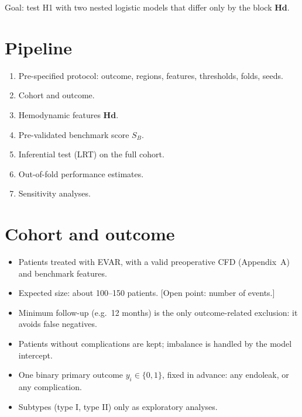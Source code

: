 Goal: test H1 with two nested logistic models that differ only by the block $\mathbf{Hd}$.

\section{Pipeline}
\begin{enumerate}
    \item Pre-specified protocol: outcome, regions, features, thresholds, folds, seeds.
    \item Cohort and outcome.
    \item Hemodynamic features $\mathbf{Hd}$.
    \item Pre-validated benchmark score $S_B$.
    \item Inferential test (LRT) on the full cohort.
    \item Out-of-fold performance estimates.
    \item Sensitivity analyses.
\end{enumerate}

\section{Cohort and outcome}
\begin{itemize}
    \item Patients treated with EVAR, with a valid preoperative CFD (Appendix~A) and benchmark features.
    \item Expected size: about 100--150 patients. [Open point: number of events.]
    \item Minimum follow-up (e.g.\ 12 months) is the only outcome-related exclusion: it avoids false negatives.
    \item Patients without complications are kept; imbalance is handled by the model intercept.
    \item One binary primary outcome $y_i \in \{0,1\}$, fixed in advance: any endoleak, or any complication.
    \item Subtypes (type I, type II) only as exploratory analyses.
\end{itemize}

